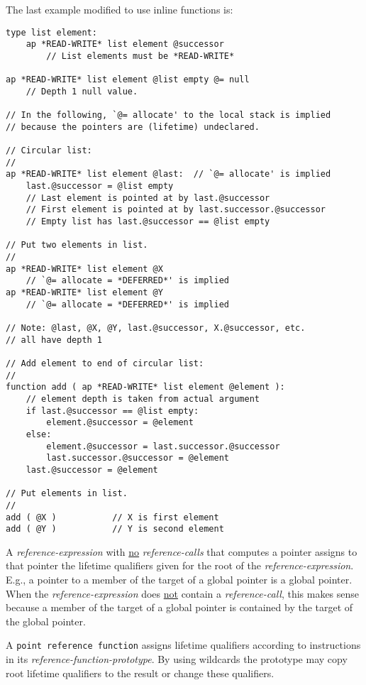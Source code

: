 \documentclass[12pt]{article}
\newenvironment{indpar}[1][0.3in]%
	{\begin{list}{}%
		     {\setlength{\itemsep}{0in}%
		      \setlength{\topsep}{0in}%
		      \setlength{\parsep}{1ex}%
		      \setlength{\labelwidth}{#1}%
		      \setlength{\leftmargin}{#1}%
		      \addtolength{\leftmargin}{\labelsep}}%
	 \item}%
	{\end{list}}
\begin{document}
The last example modified to use inline functions is:
\begin{indpar}\begin{verbatim}
type list element:
    ap *READ-WRITE* list element @successor
        // List elements must be *READ-WRITE*

ap *READ-WRITE* list element @list empty @= null
    // Depth 1 null value.

// In the following, `@= allocate' to the local stack is implied
// because the pointers are (lifetime) undeclared.

// Circular list:
//
ap *READ-WRITE* list element @last:  // `@= allocate' is implied
    last.@successor = @list empty
    // Last element is pointed at by last.@successor
    // First element is pointed at by last.successor.@successor
    // Empty list has last.@successor == @list empty

// Put two elements in list.
//
ap *READ-WRITE* list element @X
    // `@= allocate = *DEFERRED*' is implied
ap *READ-WRITE* list element @Y
    // `@= allocate = *DEFERRED*' is implied

// Note: @last, @X, @Y, last.@successor, X.@successor, etc.
// all have depth 1

// Add element to end of circular list:
//
function add ( ap *READ-WRITE* list element @element ):
    // element depth is taken from actual argument
    if last.@successor == @list empty:
        element.@successor = @element
    else:
        element.@successor = last.successor.@successor
        last.successor.@successor = @element
    last.@successor = @element

// Put elements in list.
//
add ( @X )           // X is first element
add ( @Y )           // Y is second element
\end{verbatim}\end{indpar}

A {\em reference-expression} with \underline{no} {\em reference-calls}
that computes a pointer assigns to that
pointer the lifetime qualifiers given for the root of the
{\em reference-expression}.  E.g., a pointer to a member of the
target of a global pointer is a global pointer.  When the
{\em reference-expression} does \underline{not} contain a
{\em reference-call}, this makes sense because a member of the
target of a global pointer is contained by the target of the global
pointer.

A {\tt point reference function} assigns lifetime qualifiers according
to instructions in its {\em reference-function-prototype}.  By using
wildcards the prototype may copy root lifetime qualifiers to the
result or change these qualifiers.
\end{document}
